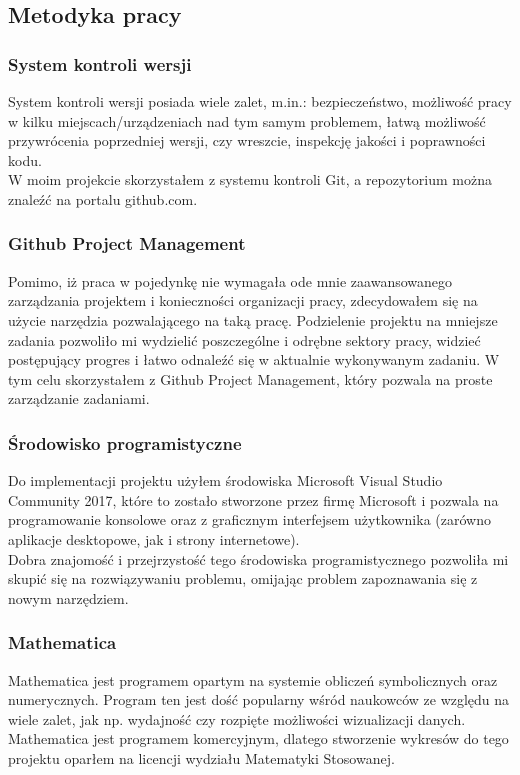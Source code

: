 \documentclass[twoside]{projektInzynierskiMS1}
\newcommand{\si}{ś}
\begin{document}
	\subsection{Metodyka pracy}
	\subsubsection{System kontroli wersji}
	System kontroli wersji posiada wiele zalet, m.in.: bezpieczeństwo, możliwo\si ć pracy w kilku miejscach/urządzeniach nad tym samym problemem, łatwą możliwo\si ć przywrócenia poprzedniej wersji, czy wreszcie, inspekcję jako\si ci i poprawno\si ci kodu. \\
W moim projekcie skorzystałem z systemu kontroli Git, a repozytorium można znaleźć na portalu github.com. 
	\subsubsection{Github Project Management}
Pomimo, iż praca w pojedynkę nie wymagała ode mnie zaawansowanego zarządzania projektem i konieczno\si ci organizacji pracy, zdecydowałem się na użycie narzędzia pozwalającego na taką pracę. Podzielenie projektu na mniejsze zadania pozwoliło mi wydzielić poszczególne i odrębne sektory pracy, widzieć postępujący progres i łatwo odnaleźć się w aktualnie wykonywanym zadaniu. W tym celu skorzystałem z Github Project Management, który pozwala na proste zarządzanie zadaniami.
	\subsubsection{Środowisko programistyczne}
Do implementacji projektu użyłem \si rodowiska Microsoft Visual Studio Community 2017, które to zostało stworzone przez firmę Microsoft i pozwala na programowanie konsolowe oraz z graficznym interfejsem użytkownika (zarówno aplikacje desktopowe, jak i strony internetowe).  \\
Dobra znajomo\si ć i przejrzysto\si ć tego \si rodowiska programistycznego pozwoliła mi skupić się na rozwiązywaniu problemu, omijając problem zapoznawania się z nowym narzędziem.
	\subsubsection{Mathematica}
	Mathematica jest programem opartym na systemie obliczeń symbolicznych oraz numerycznych. Program ten jest do\si ć popularny w\si ród naukowców ze względu na wiele zalet, jak np. wydajno\si ć czy rozpięte możliwo\si ci wizualizacji danych. Mathematica jest programem komercyjnym, dlatego stworzenie wykresów do tego projektu oparłem na licencji wydziału Matematyki Stosowanej.
	
\end{document}
